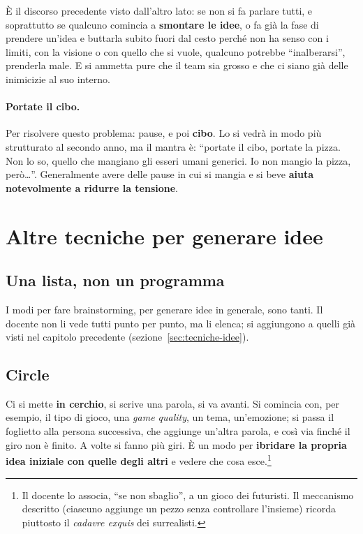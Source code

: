 È il discorso precedente visto dall'altro lato: se non si fa parlare tutti,
e soprattutto se qualcuno comincia a \textbf{smontare le idee}, o fa già la
fase di prendere un'idea e buttarla subito fuori dal cesto perché non ha
senso con i limiti, con la visione o con quello che si vuole, qualcuno
potrebbe ``inalberarsi'', prenderla male. E si ammetta pure che il team sia
grosso e che ci siano già delle inimicizie al suo interno.

\paragraph{Portate il cibo.} Per risolvere questo problema: pause, e poi
\textbf{cibo}. Lo si vedrà in modo più strutturato al secondo anno, ma il
mantra è: ``portate il cibo, portate la pizza. Non lo so, quello che
mangiano gli esseri umani generici. Io non mangio la pizza, però\dots''.
Generalmente avere delle pause in cui si mangia e si beve \textbf{aiuta
notevolmente a ridurre la tensione}.

\section{Altre tecniche per generare idee}
\label{sec:altre-tecniche}



\subsection{Una lista, non un programma}

I modi per fare brainstorming, per generare idee in generale, sono tanti. Il
docente non li vede tutti punto per punto, ma li elenca; si aggiungono a
quelli già visti nel capitolo precedente (sezione~\ref{sec:tecniche-idee}).

\subsection{Circle}

Ci si mette \textbf{in cerchio}, si scrive una parola, si va avanti. Si
comincia con, per esempio, il tipo di gioco, una \emph{game quality}, un tema,
un'emozione; si passa il foglietto alla persona successiva, che aggiunge
un'altra parola, e così via finché il giro non è finito. A volte si fanno
più giri. È un modo per \textbf{ibridare la propria idea iniziale con
quelle degli altri} e vedere che cosa esce.\footnote{Il docente lo associa,
``se non sbaglio'', a un gioco dei futuristi. Il meccanismo descritto
(ciascuno aggiunge un pezzo senza controllare l'insieme) ricorda piuttosto il
\emph{cadavre exquis} dei surrealisti.}

